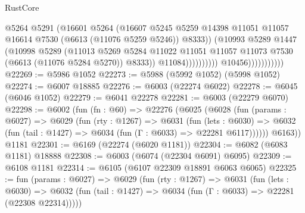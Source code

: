 \begin{lexlean}{RustCore}
\begin{coremodule}
                                            @5264
                                            @5291
                                            (@16601
                                              @5264
                                              (@16607
                                                @5245
                                                @5259
                                                @14398
                                                @11051
                                                @11057
                                                @16614
                                                @7530
                                                (@6613 (@11076 @5259 @5246))
                                                @8333))
                                            (@10993
                                              @5289
                                              @1447
                                              (@10998
                                                @5289
                                                (@11013
                                                  @5269
                                                  @5284
                                                  @11022
                                                  @11051
                                                  @11057
                                                  @11073
                                                  @7530
                                                  (@6613 (@11076 @5284 @5270))
                                                  @8333))
                                              @11084))))))))))
                          @10456)))))))))))
@22269 := @5986 @1052
@22273 := @5988 (@5992 @1052) (@5998 @1052)
@22274 := @6007 @18885
@22276 := @6003 (@22274 @6022)
@22278 := @6045 (@6046 @1052)
@22279 := @6041 @22278
@22281 := @6003 (@22279 @6070)
@22298 := @6002
    (fun (fn : @60) =>
    @22276
      (@6025
        (@6028
          (fun (params : @6027) =>
          @6029
            (fun (rty : @1267) =>
            @6031
              (fun (lets : @6030) =>
              @6032 (fun (tail : @1427) => @6034 (fun (Γ : @6033) => @22281 @6117))))))
        @6163))
    @1181
@22301 := @6169 (@22274 (@6020 @1181))
@22304 := @6082 (@6083 @1181) @18888
@22308 := @6003 (@6074 (@22304 @6091) @6095)
@22309 := @6108 @1181
@22314 := @6105 (@6107 @22309 @18891 @6063 @6065)
@22325 := fun (params : @6027) =>
  @6029
    (fun (rty : @1267) =>
    @6031
      (fun (lets : @6030) =>
      @6032 (fun (tail : @1427) => @6034 (fun (Γ : @6033) => @22281 (@22308 @22314)))))

\end{coremodule}
\end{lexlean}

